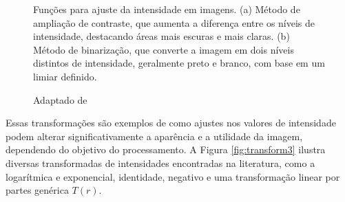 \begin{figure}[H]
    \centering
    \caption{Funções para ajuste da intensidade em imagens. (a) Método de ampliação de contraste, que aumenta a diferença entre os níveis de intensidade, destacando áreas mais escuras e mais claras. (b) Método de binarização, que converte a imagem em dois níveis distintos de intensidade, geralmente preto e branco, com base em um limiar definido.}
    \quad %
    \caption*{Adaptado de }
    \end{figure}

Essas transformações são exemplos de como ajustes nos valores de intensidade podem alterar significativamente a aparência e a utilidade da imagem, dependendo do objetivo do processamento. A Figura \ref{fig:transform3} ilustra diversas transformadas de intensidades encontradas na literatura, como a logarítmica e exponencial, identidade, negativo e uma transformação linear por partes genérica $T(r)$. 

